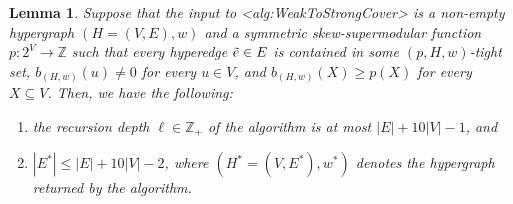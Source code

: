 \documentclass{article}
\def\Cref#1{<#1>}%
\newtheorem{lemma}{Lemma}[section]
\newcommand{\knote}[1]{{\color{red}[{\tiny Karthik: \bf #1}]\marginpar{\color{red}*}}}
\providecommand{\Z}{\mathbb{Z}}
\begin{document}
\begin{lemma}\label{lem:WeakToStrongCover:NumberOfHyperedges}
Suppose that the input to \Cref{alg:WeakToStrongCover} is a non-empty hypergraph $(H = (V, E), w)$ and a symmetric skew-supermodular function $p:2^V\rightarrow \Z$ 
such that every hyperedge $\Tilde{e} \in E$ is contained in some $(p, H, w)$-tight set, $b_{(H,w)}(u) \not = 0$ for every $u \in V$, and $b_{(H,w)}(X) \geq p(X)$ for every $X \subseteq V$. 
Then, we have the following:
    \begin{enumerate}
        \item the recursion depth $\ell \in \Z_+$ of the algorithm is at most $|E| + 10|V| - 1$, and
        \item $|E^*| \leq |E| + 10|V| - 2$, where $(H^* = (V, E^*), w^*)$ denotes the hypergraph returned by the algorithm.
    \end{enumerate}
\end{lemma}
\end{document}
